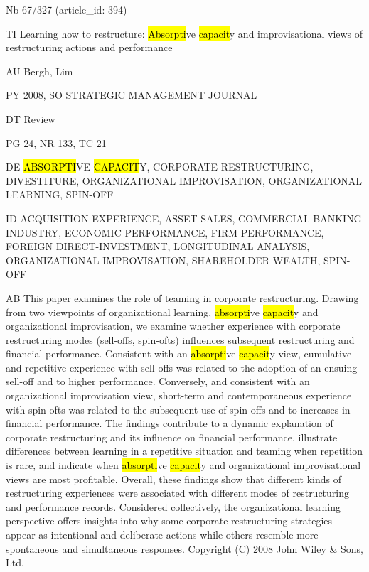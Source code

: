 \documentclass[a4paper]{article}
\begin{document}
\vspace*{-2cm}
Nb \tabto{0cm}67/327 (article\_id: 394)\par
TI \tabto{0cm}Learning how to restructure: \hl{Absorpti}ve \hl{capacit}y and improvisational views of restructuring actions and performance\par
AU \tabto{0cm}Bergh, Lim\par
PY \tabto{0cm}2008, SO STRATEGIC MANAGEMENT JOURNAL\par
DT \tabto{0cm}Review\par
PG \tabto{0cm}24, NR 133, TC 21\par
DE \tabto{0cm}\hl{ABSORPTI}VE \hl{CAPACIT}Y, CORPORATE RESTRUCTURING, DIVESTITURE, ORGANIZATIONAL IMPROVISATION, ORGANIZATIONAL LEARNING, SPIN-OFF\par
ID \tabto{0cm}ACQUISITION EXPERIENCE, ASSET SALES, COMMERCIAL BANKING INDUSTRY, ECONOMIC-PERFORMANCE, FIRM PERFORMANCE, FOREIGN DIRECT-INVESTMENT, LONGITUDINAL ANALYSIS, ORGANIZATIONAL IMPROVISATION, SHAREHOLDER WEALTH, SPIN-OFF\par
AB \tabto{0cm}This paper examines the role of teaming in corporate restructuring. Drawing from two viewpoints of organizational learning, \hl{absorpti}ve \hl{capacit}y and organizational improvisation, we examine whether experience with corporate restructuring modes (sell-offs, spin-ofts) influences subsequent restructuring and financial performance. Consistent with an \hl{absorpti}ve \hl{capacit}y view, cumulative and repetitive experience with sell-offs was related to the adoption of an ensuing sell-off and to higher performance. Conversely, and consistent with an organizational improvisation view, short-term and contemporaneous experience with spin-ofts was related to the subsequent use of spin-offs and to increases in financial performance. The findings contribute to a dynamic explanation of corporate restructuring and its influence on financial performance, illustrate differences between learning in a repetitive situation and teaming when repetition is rare, and indicate when \hl{absorpti}ve \hl{capacit}y and organizational improvisational views are most profitable. Overall, these findings show that different kinds of restructuring experiences were associated with different modes of restructuring and performance records. Considered collectively, the organizational learning perspective offers insights into why some corporate restructuring strategies appear as intentional and deliberate actions while others resemble more spontaneous and simultaneous responses. Copyright (C) 2008 John Wiley \& Sons, Ltd.\par
\clearpage
\end{document}
